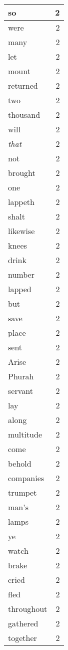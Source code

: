\begin{center}
\begin{longtable}{l|r}
so & 2\\ \hline 
were & 2\\ \hline 
many & 2\\ \hline 
let & 2\\ \hline 
mount & 2\\ \hline 
returned & 2\\ \hline 
two & 2\\ \hline 
thousand & 2\\ \hline 
will & 2\\ \hline 
\emph{that} & 2\\ \hline 
not & 2\\ \hline 
brought & 2\\ \hline 
one & 2\\ \hline 
lappeth & 2\\ \hline 
shalt & 2\\ \hline 
likewise & 2\\ \hline 
knees & 2\\ \hline 
drink & 2\\ \hline 
number & 2\\ \hline 
lapped & 2\\ \hline 
but & 2\\ \hline 
save & 2\\ \hline 
place & 2\\ \hline 
sent & 2\\ \hline 
Arise & 2\\ \hline 
Phurah & 2\\ \hline 
servant & 2\\ \hline 
lay & 2\\ \hline 
along & 2\\ \hline 
multitude & 2\\ \hline 
come & 2\\ \hline 
behold & 2\\ \hline 
companies & 2\\ \hline 
trumpet & 2\\ \hline 
man's & 2\\ \hline 
lamps & 2\\ \hline 
ye & 2\\ \hline 
watch & 2\\ \hline 
brake & 2\\ \hline 
cried & 2\\ \hline 
fled & 2\\ \hline 
throughout & 2\\ \hline 
gathered & 2\\ \hline 
together & 2\\ \hline 

\end{longtable}
\end{center}
